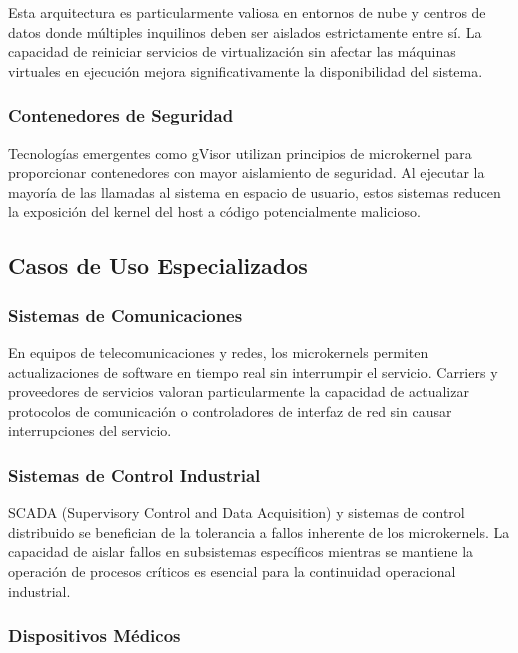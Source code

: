 \documentclass[12pt,a4paper]{article}
\begin{document}
Esta arquitectura es particularmente valiosa en entornos de nube y centros de datos donde múltiples inquilinos deben ser aislados estrictamente entre sí. La capacidad de reiniciar servicios de virtualización sin afectar las máquinas virtuales en ejecución mejora significativamente la disponibilidad del sistema.

\subsubsection{Contenedores de Seguridad}

Tecnologías emergentes como gVisor utilizan principios de microkernel para proporcionar contenedores con mayor aislamiento de seguridad. Al ejecutar la mayoría de las llamadas al sistema en espacio de usuario, estos sistemas reducen la exposición del kernel del host a código potencialmente malicioso.

\subsection{Casos de Uso Especializados}

\subsubsection{Sistemas de Comunicaciones}

En equipos de telecomunicaciones y redes, los microkernels permiten actualizaciones de software en tiempo real sin interrumpir el servicio. Carriers y proveedores de servicios valoran particularmente la capacidad de actualizar protocolos de comunicación o controladores de interfaz de red sin causar interrupciones del servicio.

\subsubsection{Sistemas de Control Industrial}

SCADA (Supervisory Control and Data Acquisition) y sistemas de control distribuido se benefician de la tolerancia a fallos inherente de los microkernels. La capacidad de aislar fallos en subsistemas específicos mientras se mantiene la operación de procesos críticos es esencial para la continuidad operacional industrial.

\subsubsection{Dispositivos Médicos}
\end{document}
